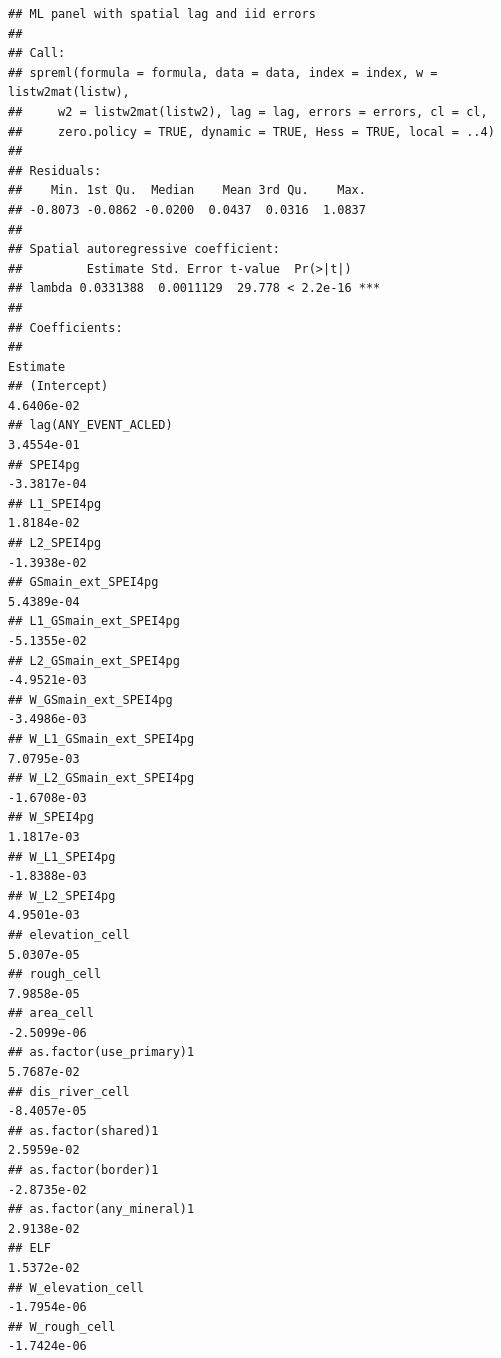 \documentclass[
  a4paper,
]{article}
\begin{document}
\begin{verbatim}
## ML panel with spatial lag and iid errors 
## 
## Call:
## spreml(formula = formula, data = data, index = index, w = listw2mat(listw), 
##     w2 = listw2mat(listw2), lag = lag, errors = errors, cl = cl, 
##     zero.policy = TRUE, dynamic = TRUE, Hess = TRUE, local = ..4)
## 
## Residuals:
##    Min. 1st Qu.  Median    Mean 3rd Qu.    Max. 
## -0.8073 -0.0862 -0.0200  0.0437  0.0316  1.0837 
## 
## Spatial autoregressive coefficient:
##         Estimate Std. Error t-value  Pr(>|t|)    
## lambda 0.0331388  0.0011129  29.778 < 2.2e-16 ***
## 
## Coefficients:
##                                                                   Estimate
## (Intercept)                                                     4.6406e-02
## lag(ANY_EVENT_ACLED)                                            3.4554e-01
## SPEI4pg                                                        -3.3817e-04
## L1_SPEI4pg                                                      1.8184e-02
## L2_SPEI4pg                                                     -1.3938e-02
## GSmain_ext_SPEI4pg                                              5.4389e-04
## L1_GSmain_ext_SPEI4pg                                          -5.1355e-02
## L2_GSmain_ext_SPEI4pg                                          -4.9521e-03
## W_GSmain_ext_SPEI4pg                                           -3.4986e-03
## W_L1_GSmain_ext_SPEI4pg                                         7.0795e-03
## W_L2_GSmain_ext_SPEI4pg                                        -1.6708e-03
## W_SPEI4pg                                                       1.1817e-03
## W_L1_SPEI4pg                                                   -1.8388e-03
## W_L2_SPEI4pg                                                    4.9501e-03
## elevation_cell                                                  5.0307e-05
## rough_cell                                                      7.9858e-05
## area_cell                                                      -2.5099e-06
## as.factor(use_primary)1                                         5.7687e-02
## dis_river_cell                                                 -8.4057e-05
## as.factor(shared)1                                              2.5959e-02
## as.factor(border)1                                             -2.8735e-02
## as.factor(any_mineral)1                                         2.9138e-02
## ELF                                                             1.5372e-02
## W_elevation_cell                                               -1.7954e-06
## W_rough_cell                                                   -1.7424e-06

\end{verbatim}
\end{document}
